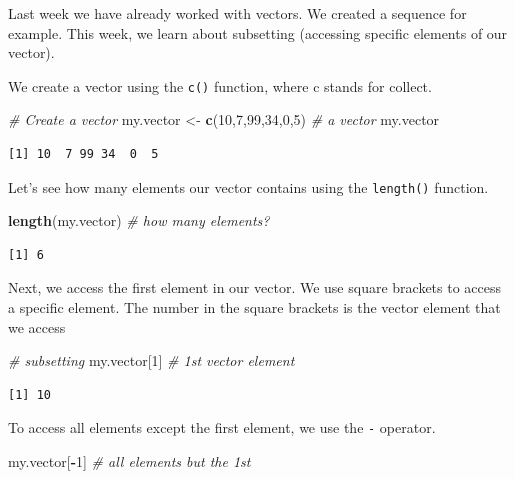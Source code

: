 \documentclass[]{article}
\newenvironment{Shaded}{\begin{snugshade}}{\end{snugshade}}
\newcommand{\KeywordTok}[1]{\textcolor[rgb]{0.13,0.29,0.53}{\textbf{#1}}}
\newcommand{\DecValTok}[1]{\textcolor[rgb]{0.00,0.00,0.81}{#1}}
\newcommand{\StringTok}[1]{\textcolor[rgb]{0.31,0.60,0.02}{#1}}
\newcommand{\CommentTok}[1]{\textcolor[rgb]{0.56,0.35,0.01}{\textit{#1}}}
\newcommand{\OperatorTok}[1]{\textcolor[rgb]{0.81,0.36,0.00}{\textbf{#1}}}
\newcommand{\NormalTok}[1]{#1}
\theoremstyle{definition}
\theoremstyle{definition}
\theoremstyle{definition}
\theoremstyle{remark}
\begin{document}
Last week we have already worked with vectors. We created a sequence for
example. This week, we learn about subsetting (accessing specific
elements of our vector).

We create a vector using the \texttt{c()} function, where c stands for
collect.

\begin{Shaded}
\begin{Highlighting}[]
\CommentTok{# Create a vector}
\NormalTok{my.vector <-}\StringTok{ }\KeywordTok{c}\NormalTok{(}\DecValTok{10}\NormalTok{,}\DecValTok{7}\NormalTok{,}\DecValTok{99}\NormalTok{,}\DecValTok{34}\NormalTok{,}\DecValTok{0}\NormalTok{,}\DecValTok{5}\NormalTok{) }\CommentTok{# a vector}
\NormalTok{my.vector}
\end{Highlighting}
\end{Shaded}

\begin{verbatim}
[1] 10  7 99 34  0  5
\end{verbatim}

Let's see how many elements our vector contains using the
\texttt{length()} function.

\begin{Shaded}
\begin{Highlighting}[]
\KeywordTok{length}\NormalTok{(my.vector) }\CommentTok{# how many elements?}
\end{Highlighting}
\end{Shaded}

\begin{verbatim}
[1] 6
\end{verbatim}

Next, we access the first element in our vector. We use square brackets
to access a specific element. The number in the square brackets is the
vector element that we access

\begin{Shaded}
\begin{Highlighting}[]
\CommentTok{# subsetting}
\NormalTok{my.vector[}\DecValTok{1}\NormalTok{] }\CommentTok{# 1st vector element}
\end{Highlighting}
\end{Shaded}

\begin{verbatim}
[1] 10
\end{verbatim}

To access all elements except the first element, we use the \texttt{-}
operator.

\begin{Shaded}
\begin{Highlighting}[]
\NormalTok{my.vector[}\OperatorTok{-}\DecValTok{1}\NormalTok{] }\CommentTok{# all elements but the 1st}
\end{Highlighting}
\end{Shaded}
\end{document}
